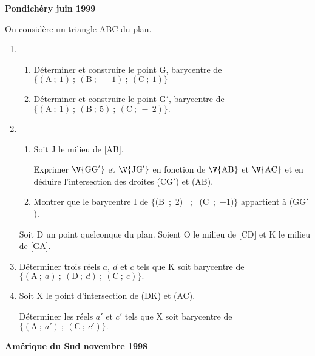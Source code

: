 \documentclass[a4paper]{article}
\begin{document}
\vspace{0,25cm}
\textbf{\large  Pondich\'ery  juin 1999}

\vspace{0,25cm}

On consid\`ere un triangle ABC du plan. 

\begin{enumerate} \item \begin{enumerate} \item D\'eterminer et construire le point G, barycentre de $\{(\text{A} ~;~ 1)~ ;~ (\text{B}~ ;~ -~ 1)~;~ (\text{C}~ ;~ 
1)\}$

\item D\'eterminer et construire le point G$'$, barycentre de $\{(\text{A}~;~ 1)~ ;~ (\text{B}~ ;~ 5)~ ;~ (\text{C}~ ;~ -~ 
2)\}.$

\end{enumerate} 

\item \begin{enumerate} \item Soit J le milieu de [AB]. 

Exprimer $\V{\text{GG}'}$ et $\V{\text{JG}'}$ en 
fonction de $\V{\text{AB}}$ et $\V{\text{AC}}$ et 
en d\'eduire l'intersection des droites (CG$'$) et (AB). 

\item Montrer que le barycentre I de $\{$(B~;~2)~ ;~ (C~;~$-1)\}$ appartient \`a 
(GG$'$). 
\end{enumerate} 
 Soit D un point quelconque du plan. Soient O le milieu 
de [CD] et K le milieu de [GA]. 



\item D\'eterminer trois r\'eels $a,~ d$ et $c$ tels que K soit barycentre de $\{(\text{A}~;~ a)~ ;~ (\text{D}~ ;~ d)~ ;~ (\text{C}~;~ c)\}.$

\item Soit X le point d'intersection de (DK) et (AC). 

D\'eterminer les r\'eels $a'$ et $c'$ tels que X soit barycentre de $\{(\text{A}~;~ a')~ ;~ (\text{C}~ ;~ c')\}.$

\end{enumerate} 


\vspace{0,25cm}
\textbf{\large Am\'erique du Sud   novembre 1998}
\end{document}
